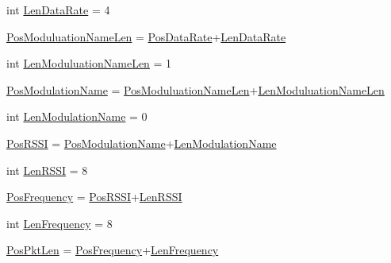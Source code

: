 \begin{DoxyCompactItemize}
\item 
int \hyperlink{namespace_simulators_1_1_tlmy_decode_test_aea72769294377163f46b0b20b1c0a8f5}{Len\+Data\+Rate} = 4
\item 
\hyperlink{namespace_simulators_1_1_tlmy_decode_test_a212d60466a9d2f07d790df5fad591706}{Pos\+Moduluation\+Name\+Len} = \hyperlink{namespace_simulators_1_1_tlmy_decode_test_af8aa110404c9f747ad0f9cac7b852c75}{Pos\+Data\+Rate}+\hyperlink{namespace_simulators_1_1_tlmy_decode_test_aea72769294377163f46b0b20b1c0a8f5}{Len\+Data\+Rate}
\item 
int \hyperlink{namespace_simulators_1_1_tlmy_decode_test_aa9a9512971a5a5001fed85a4fb6b709f}{Len\+Moduluation\+Name\+Len} = 1
\item 
\hyperlink{namespace_simulators_1_1_tlmy_decode_test_a9688c74d47ddf71d0cd7e01892aafc1e}{Pos\+Modulation\+Name} = \hyperlink{namespace_simulators_1_1_tlmy_decode_test_a212d60466a9d2f07d790df5fad591706}{Pos\+Moduluation\+Name\+Len}+\hyperlink{namespace_simulators_1_1_tlmy_decode_test_aa9a9512971a5a5001fed85a4fb6b709f}{Len\+Moduluation\+Name\+Len}
\item 
int \hyperlink{namespace_simulators_1_1_tlmy_decode_test_a45b3f41290d20a389265bc221465fd8e}{Len\+Modulation\+Name} = 0
\item 
\hyperlink{namespace_simulators_1_1_tlmy_decode_test_a7512223917a7b29e6f1edf7bd1a4174f}{Pos\+R\+S\+S\+I} = \hyperlink{namespace_simulators_1_1_tlmy_decode_test_a9688c74d47ddf71d0cd7e01892aafc1e}{Pos\+Modulation\+Name}+\hyperlink{namespace_simulators_1_1_tlmy_decode_test_a45b3f41290d20a389265bc221465fd8e}{Len\+Modulation\+Name}
\item 
int \hyperlink{namespace_simulators_1_1_tlmy_decode_test_a4230750d2f14e6c0b61c49139afea479}{Len\+R\+S\+S\+I} = 8
\item 
\hyperlink{namespace_simulators_1_1_tlmy_decode_test_a2f882befbc8ebd0ec3d730fca374692f}{Pos\+Frequency} = \hyperlink{namespace_simulators_1_1_tlmy_decode_test_a7512223917a7b29e6f1edf7bd1a4174f}{Pos\+R\+S\+S\+I}+\hyperlink{namespace_simulators_1_1_tlmy_decode_test_a4230750d2f14e6c0b61c49139afea479}{Len\+R\+S\+S\+I}
\item 
int \hyperlink{namespace_simulators_1_1_tlmy_decode_test_aa67266bdf51470854eb84aa684fe8333}{Len\+Frequency} = 8
\item 
\hyperlink{namespace_simulators_1_1_tlmy_decode_test_a6bc68f210f3bc5ee61a6c1855f717e26}{Pos\+Pkt\+Len} = \hyperlink{namespace_simulators_1_1_tlmy_decode_test_a2f882befbc8ebd0ec3d730fca374692f}{Pos\+Frequency}+\hyperlink{namespace_simulators_1_1_tlmy_decode_test_aa67266bdf51470854eb84aa684fe8333}{Len\+Frequency}

\end{DoxyCompactItemize}
